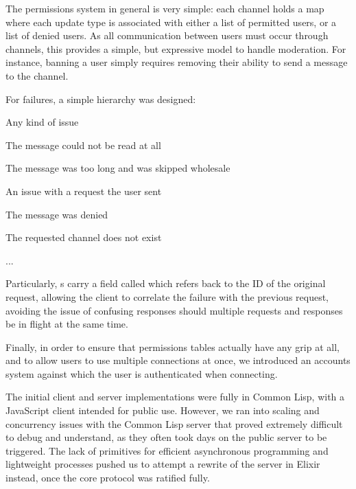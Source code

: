 \documentclass[format=sigconf]{acmart}
\begin{document}
The permissions system in general is very simple: each channel holds a map where each update type is associated with either a list of permitted users, or a list of denied users. As all communication between users must occur through channels, this provides a simple, but expressive model to handle moderation. For instance, banning a user simply requires removing their ability to send a  message to the channel.

For failures, a simple hierarchy was designed:

\begin{step}
\item {} Any kind of issue
  \begin{step}
  \item {} The message could not be read at all
  \item {} The message was too long and was skipped wholesale
  \item {} An issue with a request the user sent
    \begin{step}
    \item {} The message was denied
    \item {} The requested channel does not exist
    \item ...
    \end{step}
  \end{step}
\end{step}

Particularly, s carry a field called  which refers back to the ID of the original request, allowing the client to correlate the failure with the previous request, avoiding the issue of confusing responses should multiple requests and responses be in flight at the same time.

Finally, in order to ensure that permissions tables actually have any grip at all, and to allow users to use multiple connections at once, we introduced an accounts system against which the user is authenticated when connecting.

The initial client and server implementations were fully in Common Lisp, with a JavaScript client intended for public use. However, we ran into scaling and concurrency issues with the Common Lisp server that proved extremely difficult to debug and understand, as they often took days on the public server to be triggered. The lack of primitives for efficient asynchronous programming and lightweight processes pushed us to attempt a rewrite of the server in Elixir instead, once the core protocol was ratified fully.
      
\end{document}
